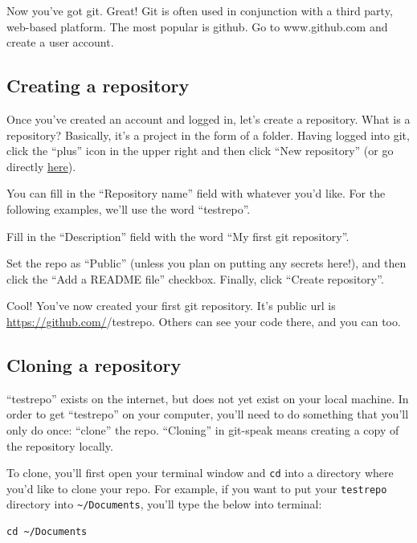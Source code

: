 \documentclass[
]{book}
\begin{document}
Now you've got git. Great! Git is often used in conjunction with a third party, web-based platform. The most popular is github. Go to www.github.com and create a user account.

\hypertarget{creating-a-repository}{%
\subsection*{Creating a repository}\label{creating-a-repository}}

Once you've created an account and logged in, let's create a repository. What is a repository? Basically, it's a project in the form of a folder. Having logged into git, click the ``plus'' icon in the upper right and then click ``New repository'' (or go directly \href{https://github.com/new}{here}).

You can fill in the ``Repository name'' field with whatever you'd like. For the following examples, we'll use the word ``testrepo''.

Fill in the ``Description'' field with the word ``My first git repository''.

Set the repo as ``Public'' (unless you plan on putting any secrets here!), and then click the ``Add a README file'' checkbox. Finally, click ``Create repository''.

Cool! You've now created your first git repository. It's public url is \url{https://github.com/}/testrepo. Others can see your code there, and you can too.

\hypertarget{cloning-a-repository}{%
\subsection*{Cloning a repository}\label{cloning-a-repository}}

``testrepo'' exists on the internet, but does not yet exist on your local machine. In order to get ``testrepo'' on your computer, you'll need to do something that you'll only do once: ``clone'' the repo. ``Cloning'' in git-speak means creating a copy of the repository locally.

To clone, you'll first open your terminal window and \texttt{cd} into a directory where you'd like to clone your repo. For example, if you want to put your \texttt{testrepo} directory into \texttt{\textasciitilde{}/Documents}, you'll type the below into terminal:

\begin{verbatim}
cd ~/Documents
\end{verbatim}
\end{document}

